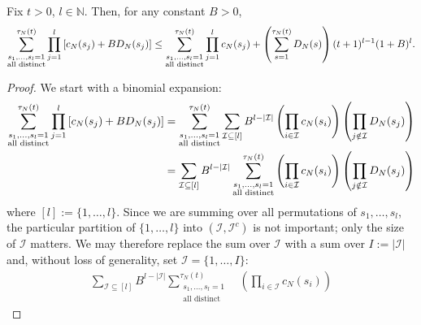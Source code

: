 \begin{lemma}\label{thm:sumprod2}
Fix $t>0$, $l\in\mathbb{N}$.
Then, for any constant $B>0$,
\begin{equation*}
\sum_{\substack{ s_1, \dots, s_l =1 \\ \text{\normalfont{all distinct}} }}^{\tau_N(t)} 
        \prod_{j=1}^l \left[ c_N(s_j) + B D_N(s_j) \right]
\leq \sum_{\substack{ s_1, \dots, s_l =1 \\ \text{\normalfont{all distinct}} }}^{\tau_N(t)} 
        \prod_{j=1}^l c_N(s_j)
        + \left( \sum_{s=1}^{\tau_N(t)} D_N(s) \right) (t+1)^{l-1} (1+B)^l .
\end{equation*}
\end{lemma}

\begin{proof}
We start with a binomial expansion:
\begin{align}
\sum_{\substack{ s_1, \dots, s_l =1 \\ \text{all distinct} }}^{\tau_N(t)} 
        \prod_{j=1}^l \left[ c_N(s_j) + B D_N(s_j) \right]
&= \sum_{\substack{ s_1, \dots, s_l =1 \\ \text{all distinct} }}^{\tau_N(t)} 
        \sum_{\mathcal{I} \subseteq [l]}
        B^{l-|\mathcal{I}|} \left( \prod_{i\in\mathcal{I}} c_N(s_i) \right)
        \left( \prod_{j\notin\mathcal{I}} D_N(s_j) \right) \notag\\
&= \sum_{\mathcal{I} \subseteq [l]} B^{l-|\mathcal{I}|}
        \sum_{\substack{ s_1, \dots, s_l =1 \\ \text{all distinct} }}^{\tau_N(t)}
        \left( \prod_{i\in\mathcal{I}} c_N(s_i) \right)
        \left( \prod_{j\notin\mathcal{I}} D_N(s_j) \right) \label{eq:010}
\end{align}
where $[l] := \{1,\dots,l\}$. Since we are summing over all permutations of $s_1,\dots,s_l$, the particular partition of $\{1,\dots,l\}$ into $(\mathcal{I},\mathcal{I}^c)$ is not important; only the size of $\mathcal{I}$ matters. We may therefore replace the sum over $\mathcal{I}$ with a sum over $I:= |\mathcal{I}|$ and, without loss of generality, set $\mathcal{I} = \{1,\dots,I\}$:
\begin{align*}
\sum_{\mathcal{I} \subseteq [l]} B^{l-|\mathcal{I}|}
        \sum_{\substack{ s_1, \dots, s_l =1 \\ \text{all distinct} }}^{\tau_N(t)}
        &\left( \prod_{i\in\mathcal{I}} c_N(s_i) \right)

\end{align*}
\end{proof}
